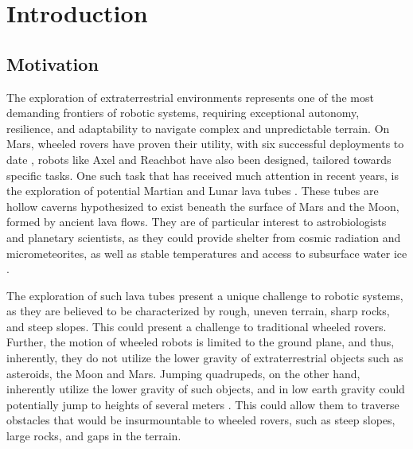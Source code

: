 \section{Introduction}
\label{sec:introduction}

\subsection{Motivation}
\label{sec:motivation}


The exploration of extraterrestrial environments represents one of the most demanding frontiers of robotic systems, requiring exceptional autonomy, resilience, and adaptability to navigate complex and unpredictable terrain. On Mars, wheeled rovers have proven their utility, with six successful deployments to date \cite{mars_rovers_x6}, robots like Axel \cite{Axel} and Reachbot \cite{ReachBot} have also been designed, tailored towards specific tasks. One such task that has received much attention in recent years, is the exploration of potential Martian and Lunar lava tubes \cite{lavatubes}. These tubes are hollow caverns hypothesized to exist beneath the surface of Mars and the Moon, formed by ancient lava flows. They are of particular interest to astrobiologists and planetary scientists, as they could provide shelter from cosmic radiation and micrometeorites, as well as stable temperatures and access to subsurface water ice \cite{lavatubes}.

The exploration of such lava tubes present a unique challenge to robotic systems, as they are believed to be characterized by rough, uneven terrain, sharp rocks, and steep slopes. This could present a challenge to traditional wheeled rovers. Further, the motion of wheeled robots is limited to the ground plane, and thus, inherently, they do not utilize the lower gravity of extraterrestrial objects such as asteroids, the Moon and Mars. Jumping quadrupeds, on the other hand, inherently utilize the lower gravity of such objects, and in low earth gravity could potentially jump to heights of several meters \cite{OLYMPUS2}. This could allow them to traverse obstacles that would be insurmountable to wheeled rovers, such as steep slopes, large rocks, and gaps in the terrain.

